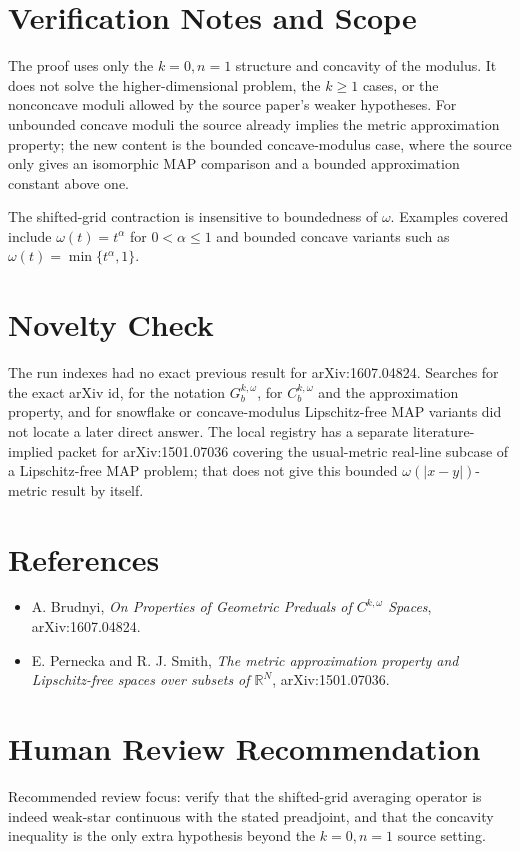 \documentclass[11pt]{article}
\begin{document}
\section*{Verification Notes and Scope}

The proof uses only the \(k=0,n=1\) structure and concavity of the modulus.
It does not solve the higher-dimensional problem, the \(k\ge 1\) cases, or
the nonconcave moduli allowed by the source paper's weaker hypotheses.  For
unbounded concave moduli the source already implies the metric approximation
property; the new content is the bounded concave-modulus case, where the
source only gives an isomorphic MAP comparison and a bounded approximation
constant above one.

The shifted-grid contraction is insensitive to boundedness of \(\omega\).
Examples covered include \(\omega(t)=t^\alpha\) for \(0<\alpha\le 1\) and
bounded concave variants such as \(\omega(t)=\min\{t^\alpha,1\}\).

\section*{Novelty Check}

The run indexes had no exact previous result for arXiv:1607.04824.  Searches
for the exact arXiv id, for the notation \(G_b^{k,\omega}\), for
\(C_b^{k,\omega}\) and the approximation property, and for snowflake or
concave-modulus Lipschitz-free MAP variants did not locate a later direct
answer.  The local registry has a separate literature-implied packet for
arXiv:1501.07036 covering the usual-metric real-line subcase of a
Lipschitz-free MAP problem; that does not give this bounded
\(\omega(|x-y|)\)-metric result by itself.

\section*{References}

\begin{itemize}
\item A. Brudnyi, \emph{On Properties of Geometric Preduals of
\(C^{k,\omega}\) Spaces}, arXiv:1607.04824.
\item E. Pernecka and R. J. Smith, \emph{The metric approximation property
and Lipschitz-free spaces over subsets of \(\mathbb R^N\)}, arXiv:1501.07036.
\end{itemize}

\section*{Human Review Recommendation}

Recommended review focus: verify that the shifted-grid averaging operator is
indeed weak-star continuous with the stated preadjoint, and that the concavity
inequality is the only extra hypothesis beyond the \(k=0,n=1\) source
setting.
\end{document}
